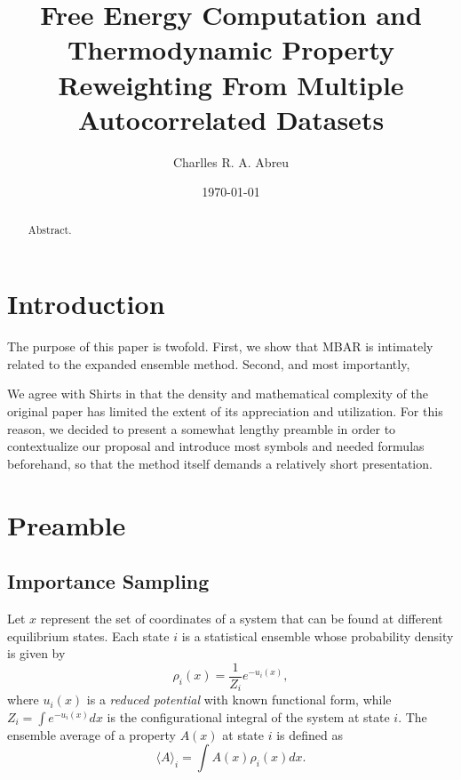 \documentclass[aip,jcp,reprint,amsmath,amssymb]{revtex4-1}
\begin{document}
\title{Free Energy Computation and Thermodynamic Property Reweighting From Multiple Autocorrelated Datasets}

\author{Charlles R. A. Abreu}

\date{\today}

\begin{abstract}
Abstract.
\end{abstract}

\maketitle

\section{Introduction}
\label{sec:introduction}

The purpose of this paper is twofold. First, we show that MBAR is intimately related to the expanded ensemble method. Second, and most importantly, 

We agree with Shirts\cite{Shirts_2017} in that the density and mathematical complexity of the original  paper has limited the extent of its appreciation and utilization. For this reason, we decided to present a somewhat lengthy preamble in order to contextualize our proposal and introduce most symbols and needed formulas beforehand, so that the method itself demands a relatively short presentation.

\section{Preamble}

\subsection{Importance Sampling}
\label{sec:definitions}

Let $x$ represent the set of coordinates of a system that can be found at different equilibrium states. Each state $i$ is a statistical ensemble whose probability density is given by
\begin{equation}
\label{eq:state_prob_density}
\rho_i(x) = \frac{1}{Z_i} e^{-u_i(x)},
\end{equation}
where $u_i(x)$ is a \textit{reduced potential}\cite{Shirts_2008, Chodera_2011} with known functional form, while $Z_i = \int e^{-u_i(x)}dx$ is the configurational integral of the system at state $i$. The ensemble average of a property $A(x)$ at state $i$ is defined as
\begin{equation}
\label{eq:ensemble average}
\langle A \rangle_i = \int A(x)\rho_i(x)dx.
\end{equation}
\end{document}
